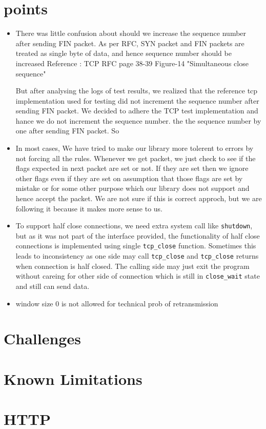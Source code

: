 \documentclass{article}
\begin{document}
\section{points}
\begin{itemize}
\item There was little confusion about should we increase the sequence number
after sending FIN packet. As per RFC, SYN packet and FIN packets are treated
as single byte of data, and hence sequence number should be increased
Reference : TCP RFC page 38-39 Figure-14 "Simultaneous close sequence"

But after analysing the logs of test results, we realized that the reference tcp 
implementation used for testing did not increment the sequence number after
sending FIN packet. We decided to adhere the TCP test implementation and hance
we do not increment the sequence number.
the the sequence number by one after sending FIN packet. So

\item In most cases, We have tried to make our library more tolerent to errors
by not forcing all the rules. Whenever we get packet, we just check to see if
the flags expected in next packet are set or not. If they are set then we
ignore other flags even if they are set on assumption that those flags are set
by mistake or for some other purpose which our library does not support 
and hence accept the packet. We are not sure if this is correct approch, but
we are following it because it makes more sense to us.

\item To support half close connections, we need extra system call like
\texttt{shutdown}, but as it was not part of the interface provided, the
functionality of half close connections is implemented using single
\texttt{tcp\_close} function. Sometimes this leads to inconsistency as one 
side may call \texttt{tcp\_close} and \texttt{tcp\_close} returns when
connection is half closed. The calling side may just exit the program without
careing for other side of connection which is still in \texttt{close\_wait}
state and still can send data.

\item window size 0 is not allowed for technical prob of retransmission



\end{itemize}
\section{Challenges}

\section{Known Limitations}

\section{HTTP}
\end{document}
